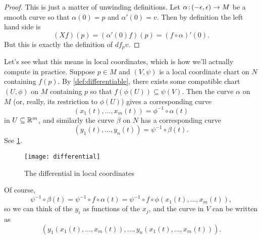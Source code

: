 \begin{proof}
	This is just a matter of unwinding definitions. Let $\alpha\colon\thinspace\!\! (-\epsilon, \epsilon) \to M$ be a smooth curve so that $\alpha(0) = p$ and $\alpha'(0) = v$. Then by definition the left hand side is
	\[
		(Xf)(p) = (\alpha'(0)f)(p) = (f \circ \alpha)'(0).
	\]
	But this is exactly the definition of $df_p v$.
\end{proof}

Let's see what this means in local coordinates, which is how we'll actually compute in practice. Suppose $p \in M$ and $(V, \psi)$ is a local coordinate chart on $N$ containing $f(p)$. By \cref{def:differentiable}, there exists some compatible chart $(U, \phi)$ on $M$ containing $p$ so that $f(\phi(U)) \subseteq \psi(V)$. Then the curve $\alpha$ on $M$ (or, really, its restriction to $\phi(U)$) gives a corresponding curve
\[
	(x_1(t), \dots , x_m(t)) = \phi^{-1} \circ \alpha(t)
\]
in $U \subseteq \mathbb{R}^m$, and similarly the curve $\beta$ on $N$ has a corresponding curve
\[
	(y_1(t), \dots , y_n(t)) = \psi^{-1} \circ \beta(t).
\]
See \cref{fig:differential}.

\begin{figure}[htbp]
	\centering
		\texttt{[image: differential]}
	\caption{The differential in local coordinates}
	\label{fig:differential}
\end{figure}

Of course,
\[
	\psi^{-1} \circ \beta(t) = \psi^{-1} \circ f \circ \alpha(t) = \psi^{-1} \circ f \circ \phi(x_1(t), \dots , x_m(t)),
\]
so we can think of the $y_i$ as functions of the $x_j$, and the curve in $V$ can be written as
\[
	(y_1(x_1(t),\dots , x_m(t)), \dots , y_n(x_1(t), \dots , x_m(t))).
\]

